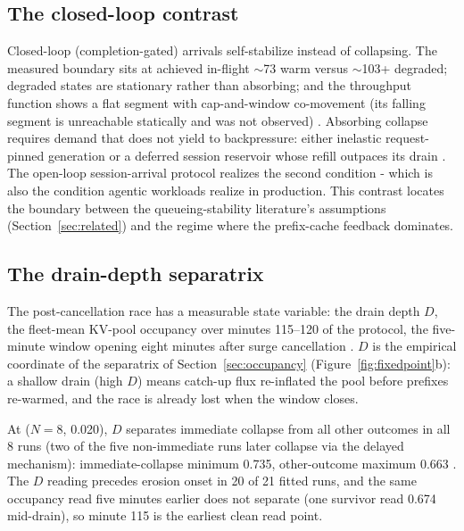 \subsection{The closed-loop contrast}
\label{sec:closedloop}

Closed-loop (completion-gated) arrivals self-stabilize instead of
collapsing. The measured boundary sits at achieved in-flight $\sim$73
warm versus $\sim$103+ degraded; degraded states are stationary rather
than absorbing; and the throughput function shows a flat segment
with cap-and-window co-movement (its falling segment is unreachable
statically and was not observed) . Absorbing collapse
requires demand that does not yield to backpressure: either
inelastic request-pinned generation or a deferred session reservoir
whose refill outpaces its drain . The open-loop
session-arrival protocol realizes the second condition - which is
also the condition agentic workloads realize in production. This
contrast locates the boundary between the queueing-stability
literature's assumptions (Section~\ref{sec:related}) and the regime where the
prefix-cache feedback dominates.

\subsection{The drain-depth separatrix}
\label{sec:separatrix}

The post-cancellation race has a measurable state variable: the
drain depth $D$, the fleet-mean KV-pool occupancy over minutes 115--120
of the protocol, the five-minute window opening eight minutes after
surge cancellation . $D$ is the empirical
coordinate of the separatrix of Section~\ref{sec:occupancy} (Figure~\ref{fig:fixedpoint}b): a shallow
drain (high $D$) means catch-up flux re-inflated the pool before
prefixes re-warmed, and the race is already lost when the window
closes.

At ($N{=}8$, 0.020), $D$ separates immediate collapse from all other
outcomes in all 8 runs (two of the five non-immediate runs later
collapse via the delayed mechanism): immediate-collapse minimum
0.735, other-outcome maximum 0.663 . The $D$ reading
precedes erosion onset in 20 of 21 fitted runs, and the same
occupancy read five minutes earlier does not separate (one survivor
read 0.674 mid-drain), so minute 115 is the earliest clean read
point.

